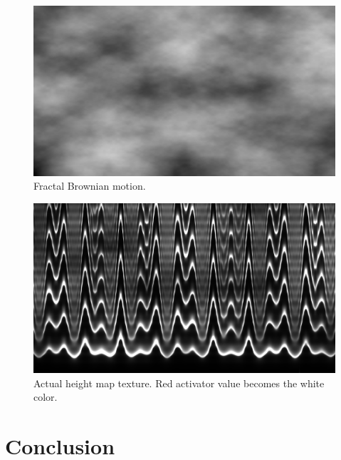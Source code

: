 \documentclass[a4paper]{article}
\begin{document}
\begin{figure}[h]
\centering\includegraphics[scale=0.2]{./img/fbm.png}
\caption{Fractal Brownian motion. \cite{st-fbm}}
\label{fbm} %
\end{figure}



\begin{figure}[h]
	\centering\includegraphics[scale=0.2]{./img/meinhardt-hexaplex.png}
	\caption{Actual height map texture. Red activator value becomes the white color. }
	\label{activator} %
\end{figure}


\section{Conclusion}
\end{document}
